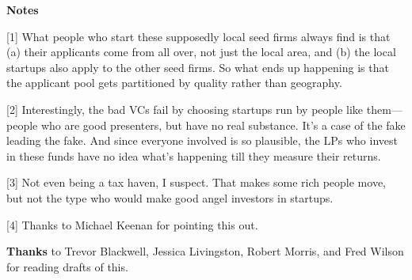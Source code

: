                   \textbf{Notes}

[1] What people who start these supposedly local seed firms
                  always find is that (a) their applicants come from all over,
                  not just the local area, and (b) the local startups also apply
                  to the other seed firms. So what ends up happening is that the
                  applicant pool gets partitioned by quality rather than
                  geography.

[2] Interestingly, the bad VCs fail by choosing startups run by
                  people like them---people who are good presenters, but
                  have no real substance. It's a case of the fake leading the
                  fake. And since everyone involved is so plausible, the LPs who
                  invest in these funds have no idea what's happening till they
                  measure their returns.

[3] Not even being a tax haven, I suspect. That makes some rich
                  people move, but not the type who would make good angel
                  investors in startups.

[4] Thanks to Michael Keenan for pointing this out.

\textbf{Thanks}
                  to Trevor Blackwell, Jessica Livingston, Robert Morris, and
                  Fred Wilson for reading drafts of this.


              
            
          
            
              
                


                  
              
            
          
